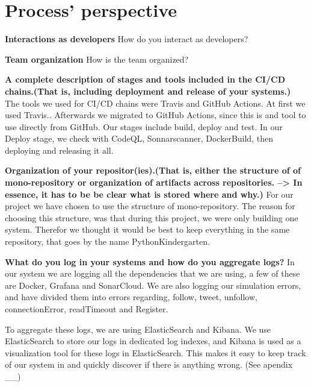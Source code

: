 \section{Process' perspective}

\textbf{Interactions as developers}\newline
 How do you interact as developers?\newline
 
\newline
\textbf{Team organization}\newline
  How is the team organized?\newline
  
  \newline
  \textbf{A complete description of stages and tools included in the CI/CD chains.(That is, including deployment and release of your systems.)}\newline
  The tools we used for CI/CD chains were Travis and GitHub Actions. At first we used Travis.. 
  Afterwards we migrated to GitHub Actions, since this is and tool to use directly from GitHub. 
  Our stages include build, deploy and test. In our Deploy stage, we check with CodeQL, Sonnarscanner, DockerBuild, then deploying and releasing it all.\newline

  \newline
  \textbf{Organization of your repositor(ies).(That is, either the structure of of mono-repository or organization of artifacts across repositories. --> In essence, it has to be be clear what is stored where and why.)} \newline
  For our project we have chosen to use the structure of mono-repository. The reason for choosing this structure, was that during this project, we were only building one system. Therefor we thought it would be best to keep everything in the same repository, that goes by the name PythonKindergarten. \newline
  
  \newline
  \textbf{What do you log in your systems and how do you aggregate logs?}  \newline
  In our system we are logging all the dependencies that we are using, a few of these are Docker, Grafana and SonarCloud. 
  We are also logging our simulation errors, and have divided them into errors regarding, follow, tweet, unfollow, connectionError, readTimeout and Register.

  To aggregate these logs, we are using ElasticSearch and Kibana. We use ElasticSearch to store our logs in dedicated log indexes, and Kibana is used as a visualization tool for these logs in ElasticSearch. This makes it easy to keep track of our system in and quickly discover if there is anything wrong. (See apendix __) \newline

